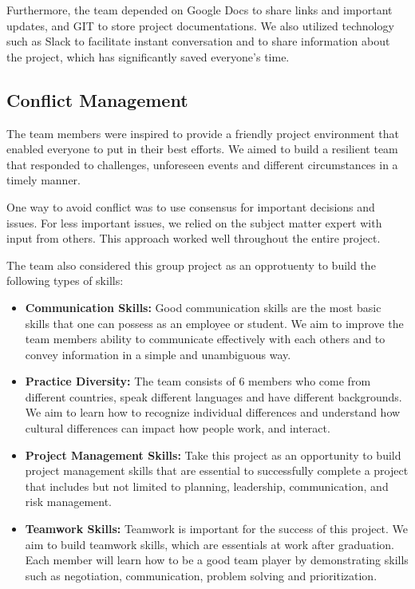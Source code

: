 \documentclass{article}
\begin{document}
Furthermore, the team depended on Google Docs to share links and important updates, and GIT to store project documentations. We also utilized technology such as Slack to facilitate instant conversation and to share information about the project, which has significantly saved everyone’s time.

\subsection{Conflict Management}
The team members were inspired to provide a friendly project environment that enabled everyone to put in their best efforts. We aimed to build a resilient team that responded to challenges, unforeseen events and different circumstances in a timely manner.

One way to avoid conflict was to use consensus for important decisions and issues. For less important issues, we relied on the subject matter expert with input from others. This approach worked well throughout the entire project.


\hfill \break %
The team also considered this group project as an opprotuenty to build the following types of skills:


\begin{itemize}
\item \textbf{Communication Skills:} Good communication skills are the most basic skills that one can possess as an employee or student. We aim to improve the team members ability to communicate effectively with each others and to convey information in a simple and unambiguous way.
\item \textbf{Practice Diversity:} The team consists of 6 members who come from different countries, speak different languages and have different backgrounds. We aim to learn how to recognize individual differences and understand how cultural differences can impact how people work, and interact.
\item \textbf{Project Management Skills:} Take this project as an opportunity to build project management skills that are essential to successfully complete a project that includes but not limited to planning, leadership, communication, and risk management.
\item \textbf{Teamwork Skills:} Teamwork is important for the success of this project. We aim to build teamwork skills, which are essentials at work after graduation. Each member will learn how to be a good team player by demonstrating skills such as negotiation, communication, problem solving and prioritization.
\end{itemize}
\end{document}

